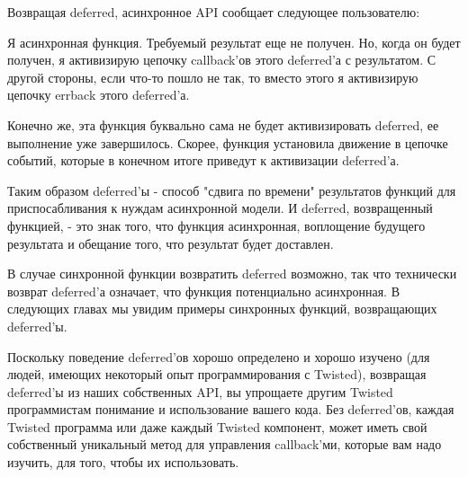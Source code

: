 Возвращая deferred, асинхронное API сообщает следующее пользователю:

    Я асинхронная функция. Требуемый результат еще не получен. 
Но, когда он будет получен, я активизирую цепочку callback'ов 
этого deferred'а с результатом. С другой стороны, если что-то пошло 
не так, то вместо этого я активизирую цепочку errback этого deferred'а.


Конечно же, эта функция буквально сама не будет активизировать 
deferred, ее выполнение уже завершилось. Скорее, функция 
установила движение в цепочке событий, которые в конечном итоге 
приведут к активизации deferred'а.   


Таким образом deferred'ы - способ "сдвига по времени" 
результатов функций для приспосабливания к нуждам 
асинхронной модели. И deferred, возвращенный функцией, - это 
знак того, что функция асинхронная, воплощение будущего 
результата и обещание того, что результат будет доставлен.


В случае синхронной функции возвратить deferred возможно, 
так что технически возврат deferred'а означает, что 
функция потенциально асинхронная. В следующих главах мы 
увидим примеры синхронных функций, возвращающих deferred'ы.


Поскольку поведение deferred'ов хорошо определено и 
хорошо изучено (для людей, имеющих некоторый опыт программирования 
с Twisted), возвращая deferred'ы из наших собственных API, 
вы упрощаете другим Twisted программистам понимание и использование 
вашего кода. Без deferred'ов, каждая Twisted программа или даже 
каждый Twisted компонент, может иметь свой собственный уникальный 
метод для управления callback'ми, которые вам надо изучить, для 
того, чтобы их использовать. 


